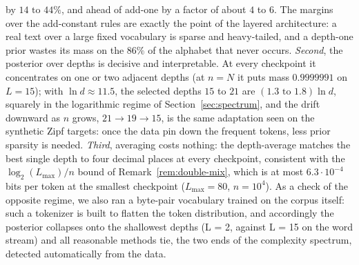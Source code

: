 \documentclass[11pt]{article}
\begin{document}
by \(14\text{ to }44\%\), and ahead of add-one by a factor of about \(4\) to
\(6\).  The margins over the add-constant rules are exactly the point of
the layered architecture: a real text over a large fixed vocabulary is
sparse and heavy-tailed, and a depth-one prior wastes its mass on the
\(86\%\) of the alphabet that never occurs.  \emph{Second}, the posterior
over depths is decisive and interpretable.  At every checkpoint it
concentrates on one or two adjacent depths (at \(n=N\) it puts mass
\(0.9999991\) on \(L=15\)); with \(\ln d\approx11.5\), the selected depths
\(15\) to \(21\) are \((1.3\text{ to }1.8)\ln d\), squarely in the logarithmic
regime of Section~\ref{sec:spectrum}, and the drift downward as \(n\)
grows, \(21\to19\to15\), is the same adaptation seen on the synthetic
Zipf targets: once the data pin down the frequent tokens, less prior
sparsity is needed.  \emph{Third}, averaging costs nothing: the
depth-average matches the best single depth to four decimal places at
every checkpoint, consistent with the \(\log_2(L_{\max})/n\) bound of
Remark~\ref{rem:double-mix}, which is at most \(6.3\cdot10^{-4}\) bits
per token at the smallest checkpoint ($L_{\max}=80$, $n=10^4$).  As a check of the opposite regime, we also ran a byte-pair
vocabulary trained on the corpus itself: such a tokenizer is built to
flatten the token distribution, and accordingly the posterior collapses onto the shallowest depths (L = 2, against L = 15 on the word stream) and all reasonable methods tie, the two ends of the
complexity spectrum, detected automatically from the data.
\FloatBarrier
\end{document}
